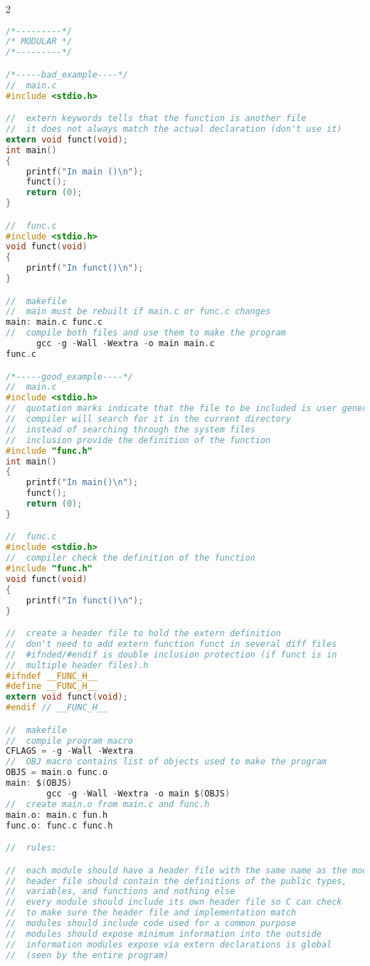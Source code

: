 \documentclass[8pt]{extarticle}
\begin{document}
\begin{small}
\begin{multicols}{2}
\begin{lstlisting}[language=C]
/*---------*/
/* MODULAR */
/*---------*/

/*-----bad_example----*/
//  main.c
#include <stdio.h>

//  extern keywords tells that the function is another file
//  it does not always match the actual declaration (don't use it)
extern void funct(void);
int main()
{
	printf("In main ()\n");
	funct();
	return (0);
}

//  func.c
#include <stdio.h>
void funct(void)
{
	printf("In funct()\n");
}

//  makefile
//  main must be rebuilt if main.c or func.c changes
main: main.c func.c
//  compile both files and use them to make the program
	  gcc -g -Wall -Wextra -o main main.c
func.c

/*-----good_example----*/
//  main.c
#include <stdio.h>
//  quotation marks indicate that the file to be included is user generated
//  compiler will search for it in the current directory
//  instead of searching through the system files
//  inclusion provide the definition of the function
#include "func.h"
int main()
{
	printf("In main()\n");
	funct();
	return (0);
}

//  func.c
#include <stdio.h>
//  compiler check the definition of the function
#include "func.h"
void funct(void)
{
	printf("In funct()\n");
}

//  create a header file to hold the extern definition
//  don't need to add extern function funct in several diff files
//  #ifnded/#endif is double inclusion protection (if funct is in 
//  multiple header files).h
#ifndef __FUNC_H__
#define __FUNC_H__
extern void funct(void);
#endif // __FUNC_H__

//  makefile
//  compile program macro
CFLAGS = -g -Wall -Wextra
//  OBJ macro contains list of objects used to make the program
OBJS = main.o func.o
main: $(OBJS)
		gcc -g -Wall -Wextra -o main $(OBJS)
//  create main.o from main.c and func.h
main.o: main.c fun.h
func.o: func.c func.h

//  rules:

//  each module should have a header file with the same name as the module
//  header file should contain the definitions of the public types, 
//  variables, and functions and nothing else
//  every module should include its own header file so C can check 
//  to make sure the header file and implementation match
//  modules should include code used for a common purpose
//  modules should expose minimum information into the outside
//  information modules expose via extern declarations is global 
//  (seen by the entire program)


\end{lstlisting}
\end{multicols}
\end{small}
\end{document}
